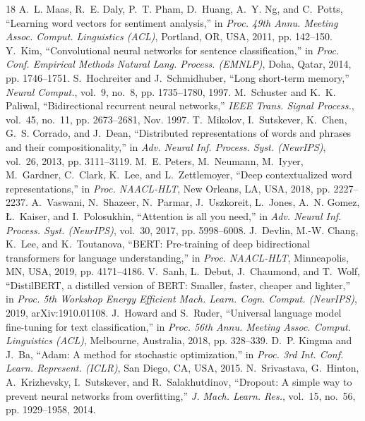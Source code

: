 \documentclass[conference,onecolumn,a4paper,10pt]{IEEEtran}
\begin{document}
\begin{thebibliography}{18}
A.~L. Maas, R.~E. Daly, P.~T. Pham, D.~Huang, A.~Y. Ng, and C.~Potts, ``Learning word vectors for sentiment analysis,'' in \emph{Proc. 49th Annu. Meeting Assoc. Comput. Linguistics (ACL)}, Portland, OR, USA, 2011, pp. 142--150.
Y.~Kim, ``Convolutional neural networks for sentence classification,'' in \emph{Proc. Conf. Empirical Methods Natural Lang. Process. (EMNLP)}, Doha, Qatar, 2014, pp. 1746--1751.
S.~Hochreiter and J.~Schmidhuber, ``Long short-term memory,'' \emph{Neural Comput.}, vol.~9, no.~8, pp. 1735--1780, 1997.
M.~Schuster and K.~K. Paliwal, ``Bidirectional recurrent neural networks,'' \emph{IEEE Trans. Signal Process.}, vol.~45, no.~11, pp. 2673--2681, Nov. 1997.
T.~Mikolov, I.~Sutskever, K.~Chen, G.~S. Corrado, and J.~Dean, ``Distributed representations of words and phrases and their compositionality,'' in \emph{Adv. Neural Inf. Process. Syst. (NeurIPS)}, vol.~26, 2013, pp. 3111--3119.
M.~E. Peters, M.~Neumann, M.~Iyyer, M.~Gardner, C.~Clark, K.~Lee, and L.~Zettlemoyer, ``Deep contextualized word representations,'' in \emph{Proc. NAACL-HLT}, New Orleans, LA, USA, 2018, pp. 2227--2237.
A.~Vaswani, N.~Shazeer, N.~Parmar, J.~Uszkoreit, L.~Jones, A.~N. Gomez, {\L}.~Kaiser, and I.~Polosukhin, ``Attention is all you need,'' in \emph{Adv. Neural Inf. Process. Syst. (NeurIPS)}, vol.~30, 2017, pp. 5998--6008.
J.~Devlin, M.-W. Chang, K.~Lee, and K.~Toutanova, ``{BERT}: Pre-training of deep bidirectional transformers for language understanding,'' in \emph{Proc. NAACL-HLT}, Minneapolis, MN, USA, 2019, pp. 4171--4186.
V.~Sanh, L.~Debut, J.~Chaumond, and T.~Wolf, ``{DistilBERT}, a distilled version of {BERT}: Smaller, faster, cheaper and lighter,'' in \emph{Proc. 5th Workshop Energy Efficient Mach. Learn. Cogn. Comput. (NeurIPS)}, 2019, arXiv:1910.01108.
J.~Howard and S.~Ruder, ``Universal language model fine-tuning for text classification,'' in \emph{Proc. 56th Annu. Meeting Assoc. Comput. Linguistics (ACL)}, Melbourne, Australia, 2018, pp. 328--339.
D.~P. Kingma and J.~Ba, ``Adam: A method for stochastic optimization,'' in \emph{Proc. 3rd Int. Conf. Learn. Represent. (ICLR)}, San Diego, CA, USA, 2015.
N.~Srivastava, G.~Hinton, A.~Krizhevsky, I.~Sutskever, and R.~Salakhutdinov, ``Dropout: A simple way to prevent neural networks from overfitting,'' \emph{J. Mach. Learn. Res.}, vol.~15, no.~56, pp. 1929--1958, 2014.

\end{thebibliography}
\end{document}
